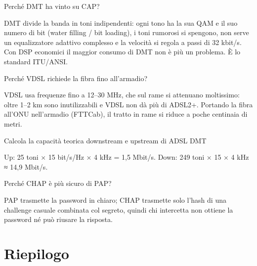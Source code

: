 \begin{approfondimento}{Perché DMT ha vinto su CAP?}

DMT divide la banda in toni indipendenti: ogni tono ha la sua QAM e il suo numero di bit (water filling / bit loading), i toni rumorosi si spengono, non serve un equalizzatore adattivo complesso e la velocità si regola a passi di 32 kbit/s. Con DSP economici il maggior consumo di DMT non è più un problema. È lo standard ITU/ANSI.

\end{approfondimento}

\begin{approfondimento}{Perché VDSL richiede la fibra fino all'armadio?}

VDSL usa frequenze fino a 12--30 MHz, che sul rame si attenuano moltissimo: oltre 1--2 km sono inutilizzabili e VDSL non dà più di ADSL2+. Portando la fibra all'ONU nell'armadio (FTTCab), il tratto in rame si riduce a poche centinaia di metri.

\end{approfondimento}

\begin{approfondimento}{Calcola la capacità teorica downstream e upstream di ADSL DMT}

Up: 25 toni × 15 bit/s/Hz × 4 kHz = 1,5 Mbit/s. Down: 249 toni × 15 × 4 kHz ≈ 14,9 Mbit/s.

\end{approfondimento}

\begin{approfondimento}{Perché CHAP è più sicuro di PAP?}

PAP trasmette la password in chiaro; CHAP trasmette solo l'hash di una challenge casuale combinata col segreto, quindi chi intercetta non ottiene la password né può riusare la risposta.

\end{approfondimento}

\section{Riepilogo}


